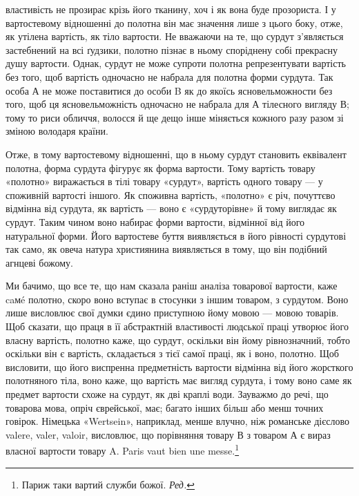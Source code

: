 \parcont{}  %
властивість не прозирає крізь його тканину, хоч і як вона буде
прозориста. І у вартостевому відношенні до полотна він має значення
лише з цього боку, отже, як утілена вартість, як тіло вартости.
Не вважаючи на те, що сурдут з’являється застебнений на
всі ґудзики, полотно пізнає в ньому споріднену собі прекрасну
душу вартости. Однак, сурдут не може супроти полотна репрезентувати
вартість без того, щоб вартість одночасно не набрала
для полотна форми сурдута. Так особа А не може поставитися до
особи B як до якоїсь ясновельможности без того, щоб ця ясновельможність
одночасно не набрала для А тілесного вигляду В;
тому то риси обличчя, волосся й ще дещо інше міняється кожного
разу разом зі зміною володаря країни.

Отже, в тому вартостевому відношенні, що в ньому сурдут
становить еквівалент полотна, форма сурдута фігурує як форма
вартости. Тому вартість товару «полотно» виражається в тілі
товару «сурдут», вартість одного товару — у споживній вартості
іншого. Як споживна вартість, «полотно» є річ, почуттєво відмінна
від сурдута, як вартість — воно є «сурдуторівне» й тому
виглядає як сурдут. Таким чином воно набирає форми вартости,
відмінної від його натуральної форми. Його вартостеве буття
виявляється в його рівності сурдутові так само, як овеча натура
християнина виявляється в тому, що він подібний агнцеві божому.

Ми бачимо, що все те, що нам сказала раніш аналіза товарової
вартости, каже caмé полотно, скоро воно вступає в стосунки з
іншим товаром, з сурдутом. Воно лише висловлює свої думки єдино
приступною йому мовою — мовою товарів. Щоб сказати, що
праця в її абстрактній властивості людської праці утворює його
власну вартість, полотно каже, що сурдут, оскільки він йому
рівнозначний, тобто оскільки він є вартість, складається з тієї
самої праці, як і воно, полотно. Щоб висловити, що його виспренна
предметність вартости відмінна від його жорсткого полотняного
тіла, воно каже, що вартість має вигляд сурдута, і тому
воно саме як предмет вартости схоже на сурдут, як дві краплі
води. Зауважмо до речі, що товарова мова, опріч єврейської, має;
багато інших більш або менш точних говірок. Німецька «Wertsein»,
наприклад, менше влучно, ніж романське дієслово valere,
valer, valoir, висловлює, що порівняння товару В з товаром А є
вираз власної вартости товару A. Paris vaut bien une messe.\footnote*{
Париж таки вартий служби божої. \emph{Ред.}
}

